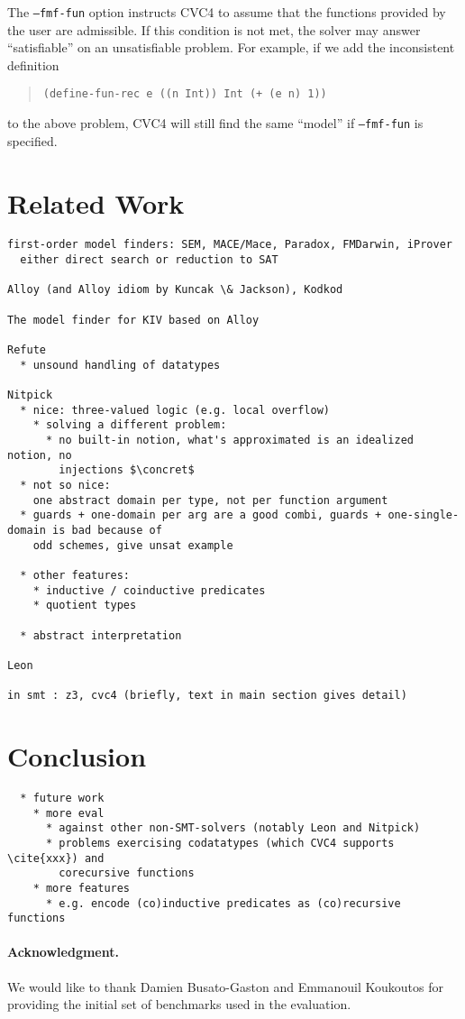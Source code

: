 \documentclass[runningheads,a4paper]{llncs}
\newcommand\concret{\gamma} %
\begin{document}
%
The \texttt{--fmf-fun} option instructs CVC4 to assume that the
functions provided by the user are admissible.
If this condition is not met, the solver may answer ``satisfiable'' on
an unsatisfiable problem. For example, if we add the inconsistent definition
%
\begin{quote}
\begin{verbatim}
(define-fun-rec e ((n Int)) Int (+ (e n) 1))
\end{verbatim}
\end{quote}
%
to the above problem, CVC4 will still find the same ``model''
if \texttt{--fmf-fun} is specified.

\section{Related Work}

\begin{verbatim}
first-order model finders: SEM, MACE/Mace, Paradox, FMDarwin, iProver
  either direct search or reduction to SAT

Alloy (and Alloy idiom by Kuncak \& Jackson), Kodkod

The model finder for KIV based on Alloy

Refute
  * unsound handling of datatypes

Nitpick
  * nice: three-valued logic (e.g. local overflow)
    * solving a different problem:
      * no built-in notion, what's approximated is an idealized notion, no
        injections $\concret$
  * not so nice:
    one abstract domain per type, not per function argument
  * guards + one-domain per arg are a good combi, guards + one-single-domain is bad because of
    odd schemes, give unsat example

  * other features:
    * inductive / coinductive predicates
    * quotient types

  * abstract interpretation

Leon

in smt : z3, cvc4 (briefly, text in main section gives detail)
\end{verbatim}

\section{Conclusion}
\label{sec:conclusion}

\begin{verbatim}
  * future work
    * more eval
      * against other non-SMT-solvers (notably Leon and Nitpick)
      * problems exercising codatatypes (which CVC4 supports \cite{xxx}) and
        corecursive functions
    * more features
      * e.g. encode (co)inductive predicates as (co)recursive functions
\end{verbatim}

{%
\def\ackname{Acknowledgment}
\paragraph{%
\ackname.}
We would like to thank Damien Busato-Gaston and Emmanouil Koukoutos for
providing the initial set of benchmarks used in the evaluation.
}



{


}
\end{document}
